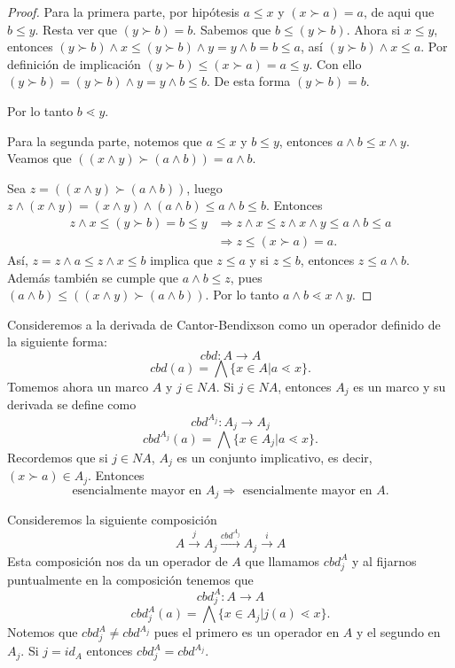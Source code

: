 \documentclass[12pt,letterpaper,titlepage]{article}
\theoremstyle{definition}
\newcommand\<{\langle}
\renewcommand\>{\rangle}
\begin{document}
\begin{proof}
Para la primera parte, por hipótesis $a\leq x$ y $(x\succ a)=a$, de aqui que $b\leq y$. Resta ver que $(y\succ b)=b$. Sabemos que $b\leq (y\succ b)$. Ahora si $x\leq y$, entonces $(y\succ b)\wedge x\leq (y\succ b)\wedge y=y\wedge b=b\leq a$, así $(y\succ b)\wedge x\leq a$. Por definición de implicación $(y\succ b)\leq (x\succ a)=a\leq y$. Con ello $(y\succ b)=(y\succ b)\wedge y=y\wedge b\leq b$. De esta forma $(y\succ b)=b$.

\noindent
Por lo tanto $b\lessdot y$.

Para la segunda parte, notemos que $a\leq x$ y $b\leq y$, entonces $a\wedge b\leq x\wedge y$. Veamos que $((x\wedge y)\succ (a\wedge b))=a\wedge b$.

\noindent
Sea $z=((x\wedge y)\succ (a\wedge b))$, luego $z\wedge (x\wedge y)=(x\wedge y)\wedge (a\wedge b)\leq a\wedge b\leq b$. Entonces 
\begin{equation*}
\begin{split}
    z\wedge x\leq (y\succ b)=b\leq y & \Rightarrow z\wedge x\leq z\wedge x\wedge y\leq a\wedge b\leq a\\
    & \Rightarrow z\leq (x\succ a)=a.
\end{split}
\end{equation*}
Así, $z= z\wedge a\leq z\wedge x\leq b$ implica que $z\leq a$ y si $z\leq b$, entonces $z\leq a\wedge b$. Además también se cumple que $a\wedge b\leq z$, pues $(a\wedge b)\leq ((x\wedge y)\succ (a\wedge b))$. Por lo tanto $a\wedge b\lessdot x\wedge y$.
\end{proof}

Consideremos a la derivada de Cantor-Bendixson como un operador definido de la siguiente forma:
$$cbd:A\to A$$
$$cbd(a)=\bigwedge\{x\in A|a\lessdot x\}.$$
Tomemos ahora un marco $A$ y $j\in NA$. Si $j\in NA$, entonces $A_j$ es un marco y su derivada se define como 
$$cbd^{A_j}:A_j\to A_j$$ 
$$cbd^{A_j}(a)=\bigwedge\{x\in A_j|a\lessdot x\}.$$
Recordemos que si $j\in NA$, $A_j$ es un conjunto implicativo, es decir, $(x\succ a)\in A_j$. Entonces $$\mbox{esencialmente mayor en }A_j\Rightarrow\mbox{ esencialmente mayor en }A.$$

Consideremos la siguiente composición
$$A\xrightarrow{j} A_j\xrightarrow{cbd^{A_j}} A_j\xrightarrow{i} A$$
Esta composición nos da un operador de $A$ que llamamos $cbd_j^{A}$ y al fijarnos puntualmente en la composición tenemos que
$$cbd_j^A:A\to A$$
$$cbd_j^{A}(a)=\bigwedge\{x\in A_j|j(a)\lessdot x\}.$$
Notemos que $cbd_j^{A}\neq cbd^{A_j}$ pues el primero es un operador en $A$ y el segundo en $A_j$. Si $j=id_A$ entonces $cbd_j^{A}= cbd^{A_j}$.
\end{document}
